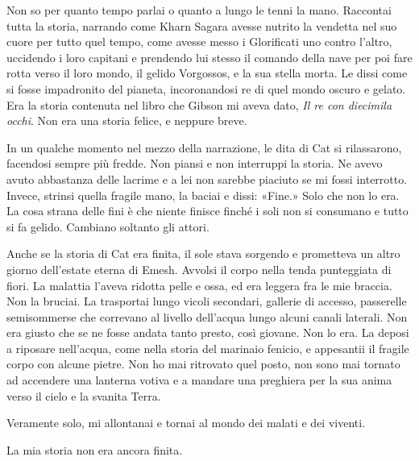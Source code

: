 Non so per quanto tempo parlai o quanto a lungo le tenni la mano.
Raccontai tutta la storia, narrando come Kharn Sagara avesse nutrito la
vendetta nel suo cuore per tutto quel tempo, come avesse messo i
Glorificati uno contro l'altro, uccidendo i loro capitani e prendendo
lui stesso il comando della nave per poi fare rotta verso il loro mondo,
il gelido Vorgossos, e la sua stella morta. Le dissi come si fosse
impadronito del pianeta, incoronandosi re di quel mondo oscuro e gelato.
Era la storia contenuta nel libro che Gibson mi aveva dato, \emph{Il re
	con diecimila occhi}. Non era una storia felice, e neppure breve.

In un qualche momento nel mezzo della narrazione, le dita di Cat si
rilassarono, facendosi sempre più fredde. Non piansi e non interruppi la
storia. Ne avevo avuto abbastanza delle lacrime e a lei non sarebbe
piaciuto se mi fossi interrotto. Invece, strinsi quella fragile mano, la
baciai e dissi: «Fine.» Solo che non lo era. La cosa strana delle fini è
che niente finisce finché i soli non si consumano e tutto si fa gelido.
Cambiano soltanto gli attori.

Anche se la storia di Cat era finita, il sole stava sorgendo e
prometteva un altro giorno dell'estate eterna di Emesh. Avvolsi il corpo
nella tenda punteggiata di fiori. La malattia l'aveva ridotta pelle e
ossa, ed era leggera fra le mie braccia. Non la bruciai. La trasportai
lungo vicoli secondari, gallerie di accesso, passerelle semisommerse che
correvano al livello dell'acqua lungo alcuni canali laterali. Non era
giusto che se ne fosse andata tanto presto, così giovane. Non lo era. La
deposi a riposare nell'acqua, come nella storia del marinaio fenicio, e
appesantii il fragile corpo con alcune pietre. Non ho mai ritrovato quel
posto, non sono mai tornato ad accendere una lanterna votiva e a mandare
una preghiera per la sua anima verso il cielo e la svanita Terra.

Veramente solo, mi allontanai e tornai al mondo dei malati e dei
viventi.

La mia storia non era ancora finita.

